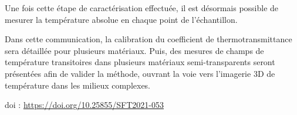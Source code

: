 {Une fois cette étape de caractérisation effectuée, il est désormais possible de mesurer la température absolue en chaque point de l'échantillon.







Dans cette communication, la calibration du coefficient de thermotransmittance sera détaillée pour plusieurs matériaux. Puis, des mesures de champs de température transitoires dans plusieurs matériaux semi-transparents seront présentées afin de valider la méthode, ouvrant la voie vers l'imagerie 3D de température dans les milieux complexes.

 \vfill doi : \url{https://doi.org/10.25855/SFT2021-053}

}
 
